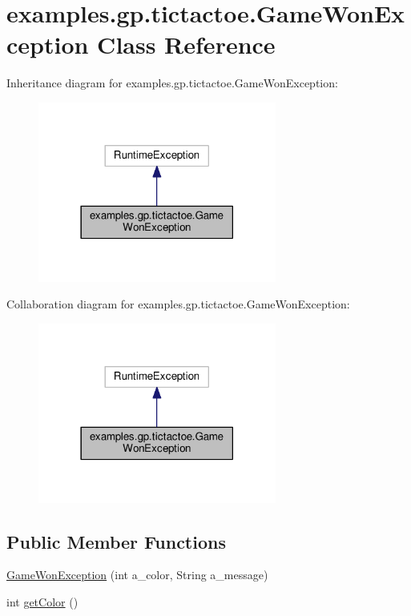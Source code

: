 \hypertarget{classexamples_1_1gp_1_1tictactoe_1_1_game_won_exception}{\section{examples.\-gp.\-tictactoe.\-Game\-Won\-Exception Class Reference}
\label{classexamples_1_1gp_1_1tictactoe_1_1_game_won_exception}
}


Inheritance diagram for examples.\-gp.\-tictactoe.\-Game\-Won\-Exception\-:
\nopagebreak
\begin{figure}[H]
\begin{center}
\leavevmode
\includegraphics[width=222pt]{classexamples_1_1gp_1_1tictactoe_1_1_game_won_exception__inherit__graph}
\end{center}
\end{figure}


Collaboration diagram for examples.\-gp.\-tictactoe.\-Game\-Won\-Exception\-:
\nopagebreak
\begin{figure}[H]
\begin{center}
\leavevmode
\includegraphics[width=222pt]{classexamples_1_1gp_1_1tictactoe_1_1_game_won_exception__coll__graph}
\end{center}
\end{figure}
\subsection*{Public Member Functions}
\begin{DoxyCompactItemize}
\item 
\hyperlink{classexamples_1_1gp_1_1tictactoe_1_1_game_won_exception_a2e4913dca4ff3b6f97c77459b148e5dd}{Game\-Won\-Exception} (int a\-\_\-color, String a\-\_\-message)
\item 
int \hyperlink{classexamples_1_1gp_1_1tictactoe_1_1_game_won_exception_aff1b763383e157eada81267a5882a1f2}{get\-Color} ()
\end{DoxyCompactItemize}
